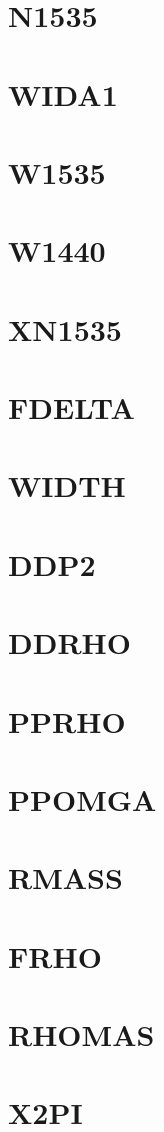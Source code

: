 \documentclass[14pt,UTF8]{ctexbook}
\begin{document}
\section{N1535}
\section{WIDA1}
\section{W1535}
\section{W1440}
\section{XN1535}
\section{FDELTA}
\section{WIDTH}
\section{DDP2}
\section{DDRHO}
\section{PPRHO}
\section{PPOMGA}
\section{RMASS}
\section{FRHO}
\section{RHOMAS}
\section{X2PI}
\end{document}
